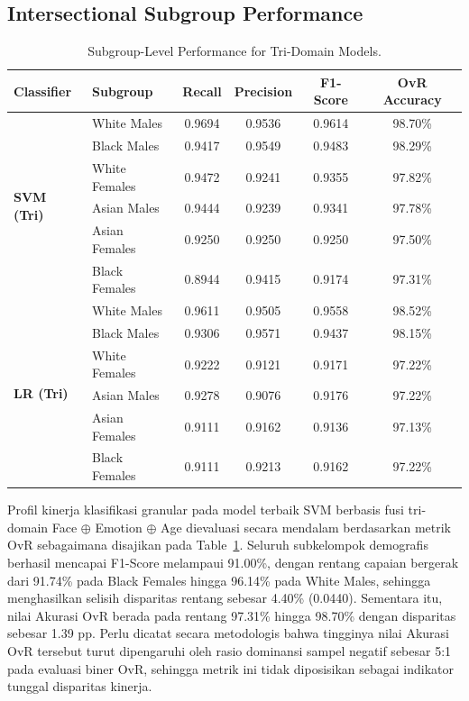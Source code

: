 \subsection{Intersectional Subgroup Performance}
\label{sec:subgroup_performance}

\begin{table}[htbp]
\caption{Subgroup-Level Performance for Tri-Domain Models.}
\label{tab:XI}
\centering
\begin{tabular}{llcccc}
\toprule
Classifier & Subgroup & Recall & Precision & F1-Score & OvR Accuracy \\
\midrule
\multirow{6}{*}{\textbf{SVM (Tri)}} & White Males & 0.9694 & 0.9536 & 0.9614 & 98.70\% \\
 & Black Males & 0.9417 & 0.9549 & 0.9483 & 98.29\% \\
 & White Females & 0.9472 & 0.9241 & 0.9355 & 97.82\% \\
 & Asian Males & 0.9444 & 0.9239 & 0.9341 & 97.78\% \\
 & Asian Females & 0.9250 & 0.9250 & 0.9250 & 97.50\% \\
 & Black Females & 0.8944 & 0.9415 & 0.9174 & 97.31\% \\
\midrule
\multirow{6}{*}{\textbf{LR (Tri)}} & White Males & 0.9611 & 0.9505 & 0.9558 & 98.52\% \\
 & Black Males & 0.9306 & 0.9571 & 0.9437 & 98.15\% \\
 & White Females & 0.9222 & 0.9121 & 0.9171 & 97.22\% \\
 & Asian Males & 0.9278 & 0.9076 & 0.9176 & 97.22\% \\
 & Asian Females & 0.9111 & 0.9162 & 0.9136 & 97.13\% \\
 & Black Females & 0.9111 & 0.9213 & 0.9162 & 97.22\% \\
\bottomrule
\end{tabular}
\end{table}

Profil kinerja klasifikasi granular pada model terbaik SVM berbasis fusi tri-domain Face $\oplus$ Emotion $\oplus$ Age dievaluasi secara mendalam berdasarkan metrik OvR sebagaimana disajikan pada Table~\ref{tab:XI}. Seluruh subkelompok demografis berhasil mencapai F1-Score melampaui 91.00\%, dengan rentang capaian bergerak dari 91.74\% pada Black Females hingga 96.14\% pada White Males, sehingga menghasilkan selisih disparitas rentang sebesar 4.40\% (0.0440). Sementara itu, nilai Akurasi OvR berada pada rentang 97.31\% hingga 98.70\% dengan disparitas sebesar 1.39 pp. Perlu dicatat secara metodologis bahwa tingginya nilai Akurasi OvR tersebut turut dipengaruhi oleh rasio dominansi sampel negatif sebesar 5:1 pada evaluasi biner OvR, sehingga metrik ini tidak diposisikan sebagai indikator tunggal disparitas kinerja.


